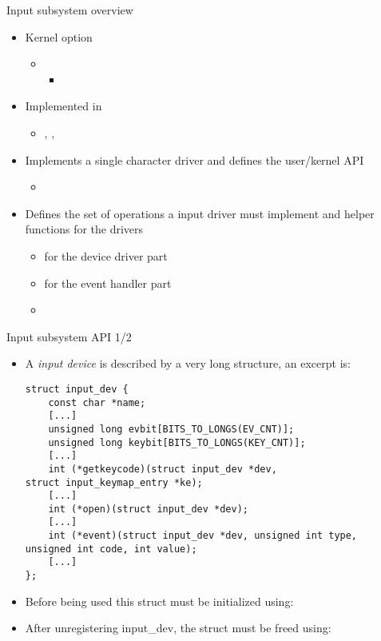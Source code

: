 \begin{frame}{Input subsystem overview}
  \begin{itemize}
  \item Kernel option 
    \begin{itemize}
    \item {}
      \begin{itemize}
      \item {}
      \end{itemize}
    \end{itemize}
  \item Implemented in 
    \begin{itemize}
    \item {}, , 
    \end{itemize}
  \item Implements a single character driver and defines the
    user/kernel API
    \begin{itemize}
    \item {}
    \end{itemize}
  \item Defines the set of operations a input driver must implement
    and helper functions for the drivers
    \begin{itemize}
    \item {} for the device driver part
    \item {} for the event handler part
    \item  {}
    \end{itemize}
  \end{itemize}
\end{frame}

\begin{frame}[fragile]{Input subsystem API 1/2}
  \begin{itemize}
  \item A {\em input device} is described by a very long 
    structure, an excerpt is:
    \begin{verbatim}
struct input_dev {
    const char *name;
    [...]
    unsigned long evbit[BITS_TO_LONGS(EV_CNT)];
    unsigned long keybit[BITS_TO_LONGS(KEY_CNT)];
    [...]
    int (*getkeycode)(struct input_dev *dev,
struct input_keymap_entry *ke);
    [...]
    int (*open)(struct input_dev *dev);
    [...]
    int (*event)(struct input_dev *dev, unsigned int type,
unsigned int code, int value);
    [...]
};
    \end{verbatim}
  \item Before being used this struct must be initialized using:
  \item After unregistering {\code input_dev}, the struct must be
    freed using: 
  \end{itemize}
\end{frame}

